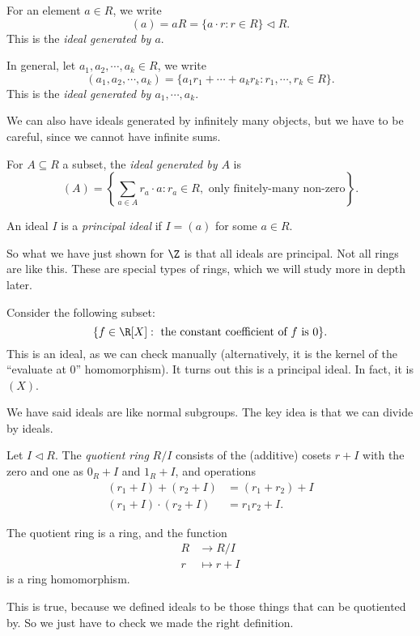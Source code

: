 \documentclass[a4paper]{article}
\begin{document}
\begin{defi}
  For an element $a \in R$, we write
  \[
    (a) = aR = \{a \cdot r: r \in R\} \lhd R.
  \]
  This is the \emph{ideal generated by $a$}.

  In general, let $a_1, a_2, \cdots, a_k \in R$, we write
  \[
    (a_1, a_2, \cdots, a_k) = \{ a_1 r_1 + \cdots + a_k r_k : r_1, \cdots, r_k \in R\}.
  \]
  This is the \emph{ideal generated by $a_1, \cdots, a_k$}.
\end{defi}
We can also have ideals generated by infinitely many objects, but we have to be careful, since we cannot have infinite sums.
\begin{defi}
  For $A \subseteq R$ a subset, the \emph{ideal generated by $A$} is
  \[
    (A) = \left\{\sum_{a \in A} r_a \cdot a: r_a \in R, \text{ only finitely-many non-zero}\right\}.
  \]
\end{defi}

\begin{defi}
  An ideal $I$ is a \emph{principal ideal} if $I = (a)$ for some $a \in R$.
\end{defi}

So what we have just shown for $\Z$ is that all ideals are principal. Not all rings are like this. These are special types of rings, which we will study more in depth later.

\begin{eg}
  Consider the following subset:
  \[
    \{f \in \R[X]: \text{ the constant coefficient of }f \text{ is }0\}.
  \]
  This is an ideal, as we can check manually (alternatively, it is the kernel of the ``evaluate at $0$'' homomorphism). It turns out this is a principal ideal. In fact, it is $(X)$.
\end{eg}

We have said ideals are like normal subgroups. The key idea is that we can divide by ideals.

\begin{defi}
  Let $I \lhd R$. The \emph{quotient ring} $R/I$ consists of the (additive) cosets $r + I$ with the zero and one as $0_R + I$ and $1_R + I$, and operations
  \begin{align*}
    (r_1 + I) + (r_2 + I) &= (r_1 + r_2) + I\\
    (r_1 + I) \cdot (r_2 + I) &= r_1r_2 + I.
  \end{align*}
\end{defi}

\begin{prop}
  The quotient ring is a ring, and the function
  \begin{align*}
    R &\to R/I\\
    r &\mapsto r + I
  \end{align*}
  is a ring homomorphism.
\end{prop}
This is true, because we defined ideals to be those things that can be quotiented by. So we just have to check we made the right definition.
\end{document}
